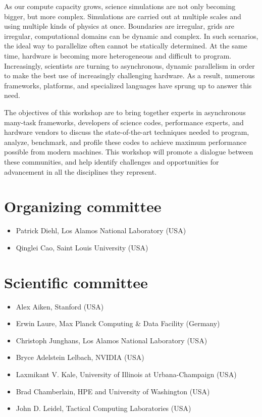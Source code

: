 As our compute capacity grows, science simulations are not only becoming bigger, but more complex. Simulations are carried out at multiple scales and using multiple kinds of physics at once. Boundaries are irregular, grids are irregular, computational domains can be dynamic and complex. In such scenarios, the ideal way to parallelize often cannot be statically determined. At the same time, hardware is becoming more heterogeneous and difficult to program. Increasingly, scientists are turning to asynchronous, dynamic parallelism in order to make the best use of increasingly challenging hardware. As a result, numerous frameworks, platforms, and specialized languages have sprung up to answer this need.

The objectives of this workshop are to bring together experts in asynchronous many-task frameworks, developers of science codes, performance experts, and hardware vendors to discuss the state-of-the-art techniques needed to program, analyze, benchmark, and profile these codes to achieve maximum performance possible from modern machines. This workshop will promote a dialogue between these communities, and help identify challenges and opportunities for advancement in all the disciplines they represent.

\section*{Organizing committee}
\begin{itemize}
\item Patrick Diehl, Los Alamos National Laboratory (USA)
\item Qinglei Cao, Saint Louis University (USA)
\end{itemize}

\section*{Scientific committee}
\begin{itemize}
\item Alex Aiken, Stanford (USA)
\item Erwin Laure, Max Planck Computing \& Data Facility (Germany)
\item Christoph Junghans, Los Alamos National Laboratory (USA)
\item Bryce Adelstein Lelbach, NVIDIA (USA)
\item Laxmikant V. Kale, University of Illinois at Urbana-Champaign (USA)
\item Brad Chamberlain, HPE and University of Washington (USA)
\item John D. Leidel, Tactical Computing Laboratories (USA) 
\end{itemize}


